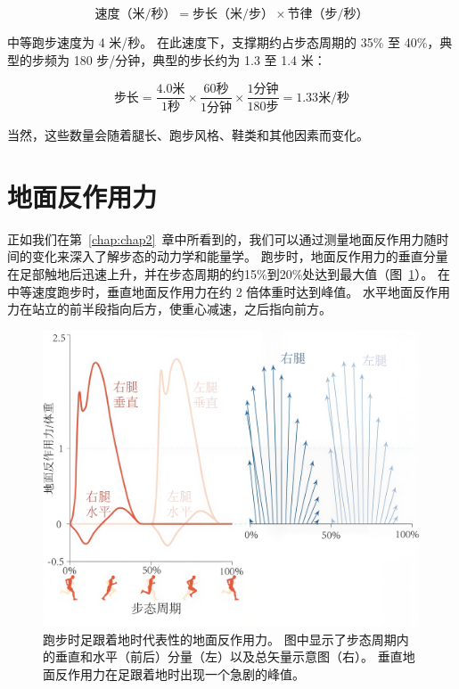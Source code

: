 \begin{equation}
	\text{速度（米/秒）} = \text{步长（米/步）} \times \text{节律（步/秒）} \label{eq:3_1}
\end{equation}

中等跑步速度为 4 米/秒。
在此速度下，支撑期约占步态周期的 35\% 至 40\%，典型的步频为 180 步/分钟，典型的步长约为 1.3 至 1.4 米：

\begin{equation}
	\text{步长} = \frac{4.0 \text{米}}{1 \text{秒}}
				 \times \frac{60 \text{秒}}{1 \text{分钟}}
				 \times \frac{1 \text{分钟}}{180 \text{步}}
				 = 1.33 \text{米/秒}
				 \label{eq:3_2}
\end{equation}

当然，这些数量会随着腿长、跑步风格、鞋类和其他因素而变化。


\section{地面反作用力}

正如我们在第~\ref{chap:chap2}~章中所看到的，我们可以通过测量地面反作用力随时间的变化来深入了解步态的动力学和能量学。
跑步时，地面反作用力的垂直分量在足部触地后迅速上升，并在步态周期的约15\%到20\%处达到最大值（图~\ref{fig:3_2}）。
在中等速度跑步时，垂直地面反作用力在约 2 倍体重时达到峰值。
水平地面反作用力在站立的前半段指向后方，使重心减速，之后指向前方。

\begin{figure}[!htb]
	\centering
	\includegraphics[width=1.0\linewidth]{chap3/3_2}
	\caption{跑步时足跟着地时代表性的地面反作用力。
		图中显示了步态周期内的垂直和水平（前后）分量（左）以及总矢量示意图（右）。
		垂直地面反作用力在足跟着地时出现一个急剧的峰值\cite{yong2020foot}。 \label{fig:3_2}}
\end{figure}

